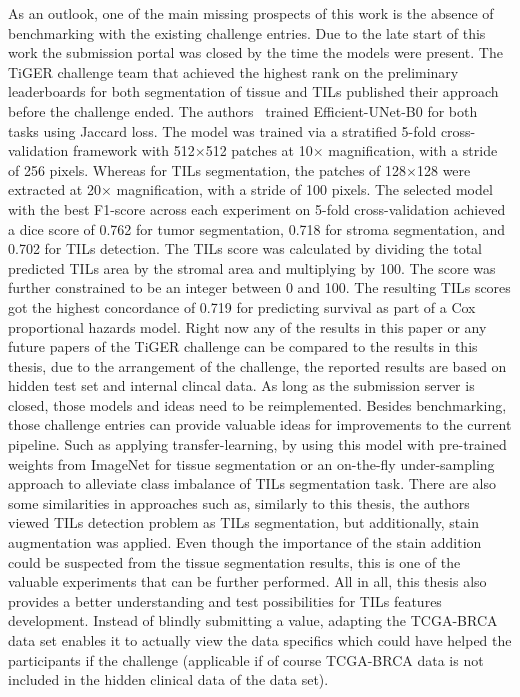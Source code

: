 As an outlook, one of the main missing prospects of this work is the absence of
benchmarking with the existing challenge entries. Due to the late start of this
work the submission portal was closed by the time the models were present. 
The TiGER challenge team that achieved the highest rank on the preliminary leaderboards
for both segmentation of tissue and TILs published their approach before the challenge ended.
The authors~\cite{shephard2022tiager} trained Efficient-UNet-B0 for both tasks using Jaccard loss.
The model was trained via a stratified 5-fold
cross-validation framework with 512$\times$512 patches at 10$\times$ magnification,
with a stride of 256 pixels. Whereas for TILs segmentation,
the patches of 128$\times$128 were extracted at 20$\times$ magnification, with a stride of 100 pixels.
The selected model with the best F1-score across each experiment on 5-fold cross-validation achieved
a dice score of 0.762 for tumor segmentation, 0.718 for stroma segmentation, and  0.702 for TILs
detection. The TILs score was calculated by dividing the total predicted TILs area by the stromal
area and multiplying by 100. The score was further constrained to be an integer between 0 and 100.
The resulting TILs scores got the highest concordance of 0.719 for predicting survival as part of
a Cox proportional hazards model. Right now any of the results in this paper or any future papers
of the TiGER challenge can be compared to the results in this thesis, due to the arrangement of the
challenge, the reported results are based on hidden test set and internal clincal data.
As long as the submission server is closed, those models and ideas need to be reimplemented.
Besides benchmarking, those challenge entries can provide valuable ideas for improvements to the current pipeline.
Such as applying transfer-learning, by using this model with pre-trained weights from ImageNet for tissue
segmentation or an on-the-fly under-sampling approach to alleviate class imbalance of TILs segmentation task.
There are also some similarities in approaches such as, similarly to this thesis, the authors~\cite{shephard2022tiager}
viewed TILs detection problem as TILs segmentation, but additionally, stain augmentation was applied. Even though the
importance of the stain addition could be
suspected from the tissue segmentation results, this is one of the valuable experiments that can be further performed.
All in all, this thesis also provides a better understanding and test possibilities for TILs features development.
Instead of blindly submitting a value, adapting the TCGA-BRCA data set enables it to actually view the data specifics
which could have helped the participants if the challenge (applicable if of course TCGA-BRCA data is not included in
the hidden clinical data of the data set).
